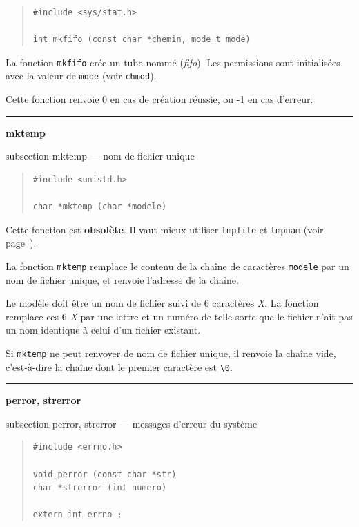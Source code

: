 \documentclass [twoside] {report}
\newcommand {\primitive} [1]
    {
	\phantomsection
	{\large \textbf {#1}}
	\addcontentsline {toc} {subsection} {#1}
    }
\newcommand {\separation}
    {
	\vspace {5mm}
	\nopagebreak
	\hrule
    }
\begin{document}
\begin {quote}
\begin {verbatim}
#include <sys/stat.h>

int mkfifo (const char *chemin, mode_t mode)
\end{verbatim}
\end {quote}

La fonction \texttt {mkfifo} crée un tube nommé (\emph {fifo}).
Les permissions sont initialisées avec la valeur de \texttt {mode}
(voir \texttt {chmod}).

Cette fonction renvoie 0 en cas de création
réussie, ou -1 en cas d'erreur.




\separation 
\primitive {mktemp} --- nom de fichier unique

\begin {quote}
\begin {verbatim}
#include <unistd.h>

char *mktemp (char *modele)
\end{verbatim}
\end {quote}

Cette fonction est \textbf {obsolète}. Il vaut mieux utiliser \texttt {tmpfile} et
\texttt {tmpnam} (voir page~\pageref {tmpfile}).

La fonction \texttt {mktemp} remplace le contenu de la chaîne de
caractères \texttt {modele} par un nom de fichier unique, et
renvoie l'adresse de la chaîne.

Le modèle doit être un nom de fichier suivi de 6 caractères
\textit {X}. La fonction remplace ces 6 \textit {X} par une lettre et un
numéro de telle sorte que le fichier n'ait pas un nom
identique à celui d'un fichier existant.

Si \texttt {mktemp} ne peut renvoyer de nom de fichier unique, il
renvoie la chaîne vide, c'est-à-dire la chaîne dont le
premier caractère est \verb:\0:.




\separation 
\primitive {perror, strerror} --- messages d'erreur du système

\begin {quote}
\begin {verbatim}
#include <errno.h>

void perror (const char *str)
char *strerror (int numero)

extern int errno ;
\end{verbatim}
\end {quote}
\end{document}
